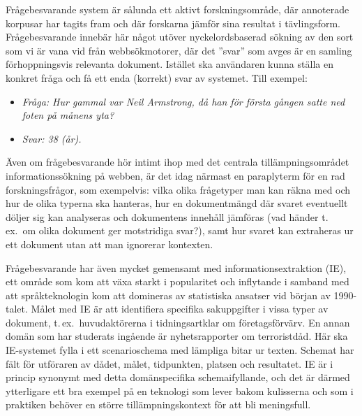 \begin{multicols}{2}

Frågebesvarande system är sålunda ett aktivt forskningsområde, där
annoterade korpusar har tagits fram och där forskarna jämför sina
resultat i tävlingsform. Frågebesvarande innebär här något utöver
nyckelordsbaserad sökning av den sort som vi är vana vid från
webbsökmotorer, där det ''svar'' som avges är en samling
förhoppningsvis relevanta dokument. Istället ska användaren kunna
ställa en konkret fråga och få ett enda (korrekt) svar av
systemet. Till exempel:

\begin{itemize}
\item[]\textit{Fråga: Hur gammal var Neil Armstrong, då han för första gången satte ned foten på månens yta?}
\item[]\textit{Svar: 38 (år).}
\end{itemize}

Även om frågebesvarande hör intimt ihop med det centrala
tillämpningsområdet informationssökning på webben, är det idag närmast
en paraplyterm för en rad forskningsfrågor, som exempelvis: vilka
olika frågetyper man kan räkna med och hur de olika typerna ska
hanteras, hur en dokumentmängd där svaret eventuellt döljer sig kan
analyseras och dokumentens innehåll jämföras (vad händer t.\,ex.~om
olika dokument ger motstridiga svar?), samt hur svaret kan extraheras
ur ett dokument utan att man ignorerar kontexten.

Frågebesvarande har även mycket gemensamt med
in\-forma\-tions\-ex\-trak\-tion (IE), ett område som kom att växa
starkt i popularitet och inflytande i samband med att språkteknologin
kom att domineras av statistiska ansatser vid början av
1990-talet. Målet med IE är att identifiera specifika sakuppgifter i
vissa typer av dokument, t.\,ex.~huvudaktörerna i tidningsartklar om
företagsförvärv. En annan domän som har studerats ingående är
nyhetsrapporter om terroristdåd. Här ska IE-systemet fylla i ett
scenarioschema med lämpliga bitar ur texten. Schemat har fält för
utföraren av dådet, målet, tidpunkten, platsen och resultatet. IE är i
princip synonymt med detta domänspecifika schemaifyllande, och det är
därmed ytterligare ett bra exempel på en teknologi som lever bakom
kulisserna och som i praktiken behöver en större tillämpningskontext
för att bli meningsfull.


\end{multicols}
